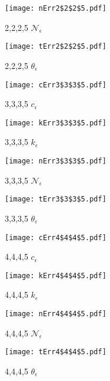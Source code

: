 \documentclass[12pt]{article}
\begin{document}
\begin{figure}
  \centering
\texttt{[image: nErr2\$2\$2\$5.pdf]}  
  \caption{2,2,2,5 $\mathcal{N}_\epsilon$}
\end{figure}


\begin{figure}
  \centering
\texttt{[image: tErr2\$2\$2\$5.pdf]}  
  \caption{2,2,2,5 $\theta_\epsilon$}
\end{figure}


\begin{figure}
  \centering
\texttt{[image: cErr3\$3\$3\$5.pdf]}  
  \caption{3,3,3,5 $c_\epsilon$}
\end{figure}


\begin{figure}
  \centering
\texttt{[image: kErr3\$3\$3\$5.pdf]}  
  \caption{3,3,3,5 $k_\epsilon$}
\end{figure}


\begin{figure}
  \centering
\texttt{[image: nErr3\$3\$3\$5.pdf]}  
  \caption{3,3,3,5 $\mathcal{N}_\epsilon$}
\end{figure}


\begin{figure}
  \centering
\texttt{[image: tErr3\$3\$3\$5.pdf]}  
  \caption{3,3,3,5 $\theta_\epsilon$}
\end{figure}




\begin{figure}
  \centering
\texttt{[image: cErr4\$4\$4\$5.pdf]}  
  \caption{4,4,4,5 $c_\epsilon$}
\end{figure}


\begin{figure}
  \centering
\texttt{[image: kErr4\$4\$4\$5.pdf]}  
  \caption{4,4,4,5 $k_\epsilon$}
\end{figure}


\begin{figure}
  \centering
\texttt{[image: nErr4\$4\$4\$5.pdf]}  
  \caption{4,4,4,5 $\mathcal{N}_\epsilon$}
\end{figure}


\begin{figure}
  \centering
\texttt{[image: tErr4\$4\$4\$5.pdf]}  
  \caption{4,4,4,5 $\theta_\epsilon$}
\end{figure}
\end{document}
